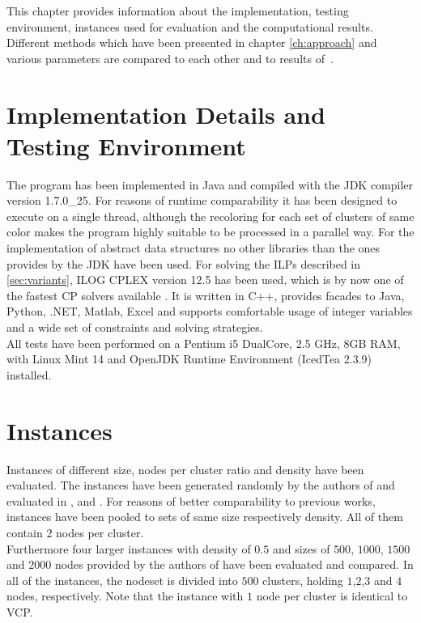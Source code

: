 This chapter provides information about the implementation, testing environment, instances used for evaluation and the computational results. Different methods which have been presented in chapter \ref{ch:approach} and various parameters are compared to each other and to results of~\cite{li-00, noronha-06, frota-07}. 

\section{Implementation Details and Testing Environment}
The program has been implemented in Java and compiled with the JDK compiler version 1.7.0\_25. For reasons of runtime comparability it has been designed to execute on a single thread, although the recoloring for each set of clusters of same color makes the program highly suitable to be processed in a parallel way. For the implementation of abstract data structures no other libraries than the ones provides by the JDK have been used. For solving the ILPs described in \ref{sec:variants}, ILOG CPLEX version 12.5 has been used, which is by now one of the fastest CP solvers available \cite{Meindl-12}. It is written in C++, provides facades to Java, Python, .NET, Matlab, Excel and supports comfortable usage of integer variables and a wide set of constraints and solving strategies.\\
All tests have been performed on a Pentium i5 DualCore, 2.5 GHz, 8GB RAM, with Linux Mint 14 and OpenJDK Runtime Environment (IcedTea 2.3.9) installed.

\section{Instances}
Instances of different size, nodes per cluster ratio and density have been evaluated. The instances have been generated randomly by the authors of \cite{frota-07} and evaluated in \cite{frota-07}, \cite{pop-13} and \cite{volko-13}. For reasons of better comparability to previous works, instances have been pooled to sets of same size respectively density. All of them contain $2$ nodes per cluster.\\ 
Furthermore four larger instances with density of $0.5$ and sizes of $500$, $1000$, $1500$ and $2000$ nodes provided by the authors of \cite{noronha-06} have been evaluated and compared. In all of the instances, the nodeset is divided into $500$ clusters, holding $1$,$2$,$3$ and $4$ nodes, respectively. Note that the instance with $1$ node per cluster is identical to VCP. 

